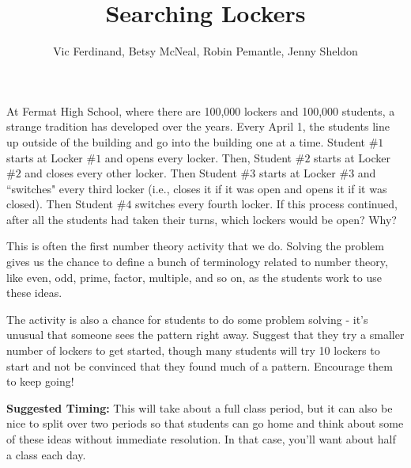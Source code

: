 \documentclass{ximera}
\title{Searching Lockers}
\author{Vic Ferdinand, Betsy McNeal, Robin Pemantle, Jenny Sheldon}
\begin{document}
\begin{abstract} \end{abstract}
\maketitle


\begin{problem}
At Fermat High School, where there are 100,000 lockers and 100,000 students, a strange tradition has developed over the years.  Every April 1, the students line up outside of the building and go into the building one at a time.  Student $\#1$ starts at Locker $\#1$ and opens every locker.  Then, Student $\#2$ starts at Locker $\#2$  and closes every other locker.  Then Student $\#3$ starts at Locker $\#3$ and ``switches" every third locker (i.e., closes it if it was open and opens it if it was closed).  Then Student $\#4$ switches every fourth locker.  If this process continued, after all the students had taken their turns, which lockers would be open?  Why?
\end{problem}
\newpage

\begin{instructorNotes}
This is often the first number theory activity that we do.  Solving the problem gives us the chance to define a bunch of terminology related to number theory, like even, odd, prime, factor, multiple, and so on, as the students work to use these ideas.

The activity is also a chance for students to do some problem solving - it's unusual that someone sees the pattern right away.  Suggest that they try a smaller number of lockers to get started, though many students will try 10 lockers to start and not be convinced that they found much of a pattern.  Encourage them to keep going!

{\bf Suggested Timing:} This will take about a full class period, but it can also be nice to split over two periods so that students can go home and think about some of these ideas without immediate resolution.  In that case, you'll want about half a class each day.
\end{instructorNotes}
\end{document}
